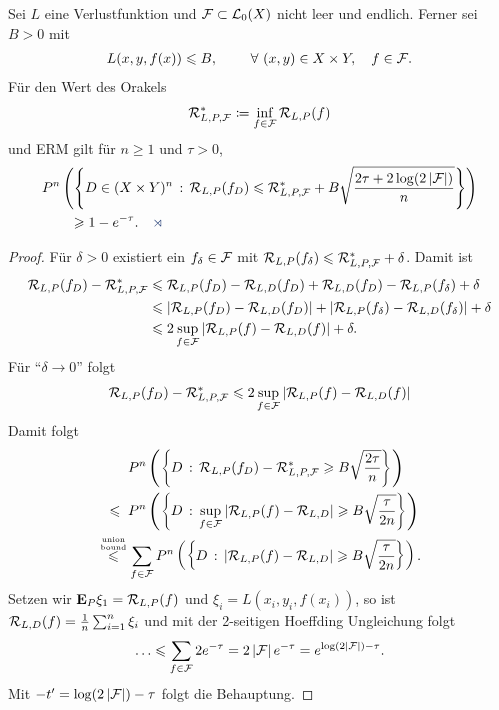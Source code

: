 \begin{prop}[Orakelungleichung I]
\label{prop:4.1.2}
Sei $L$ eine Verlustfunktion und $\mathcal{F}\subset\mathcal{L}_0(X)$ nicht leer und endlich.
Ferner sei $B>0$ mit
\begin{align*}
L(x,y,f(x)) \le B,\qquad \forall (x,y)\in X\times Y,\quad f\in\FF.
\end{align*}
Für den Wert des Orakels
\begin{align*}
\mathcal{R}_{L,P,\mathcal{F}}^* \coloneq \inf_{f\in\mathcal{F}} \mathcal{R}_{L,P}(f)
\end{align*}
und ERM gilt für $n\ge 1$ und $\tau > 0$,
\begin{align*}
&P^n\left(\setdef{D\in (X\times Y)^n}{\RR_{L,P}(f_D) \le \RR_{L,P,\FF}^* +
B\sqrt{\frac{2\tau + 2\log(2\abs{\FF})}{n}} } \right)\\ 
&\qquad\ge 1-e^{-\tau}.\fishhere
\end{align*}
\end{prop}
\begin{proof}
Für $\delta > 0$ existiert ein $f_\delta \in\mathcal{F}$ mit $\mathcal{R}_{L,P}(f_\delta)\leqslant
\mathcal{R}_{L,P,\mathcal{F}}^* + \delta$. Damit ist
\begin{align*}
\mathcal{R}_{L,P}(f_D) - \mathcal{R}_{L,P,\mathcal{F}}^*
&\leqslant \mathcal{R}_{L,P}(f_D)-\mathcal{R}_{L,D}(f_D) + \mathcal{R}_{L,D}(f_D)
- \mathcal{R}_{L,P}(f_\delta)+ \delta\\
&\leqslant \left|\mathcal{R}_{L,P}(f_D)-\mathcal{R}_{L,D}(f_D)\right| + 
\left|\mathcal{R}_{L,P}(f_\delta)-\mathcal{R}_{L,D}(f_\delta)\right| + \delta\\
&\leqslant 2 \sup_{f\in\mathcal{F}} \left|\mathcal{R}_{L,P}(f)-\mathcal{R}_{L,D}(f)\right| + \delta.
\end{align*}
Für "`$\delta\to 0$"' folgt
\begin{align*}
\mathcal{R}_{L,P}(f_D) - \mathcal{R}_{L,P,\mathcal{F}}^* \leqslant
2 \sup_{f\in\mathcal{F}} \left|\mathcal{R}_{L,P}(f)-\mathcal{R}_{L,D}(f)\right|
\end{align*}
Damit folgt
\begin{align*}
&P^n\left(\setdef{D}{\RR_{L,P}(f_D)- \RR_{L,P,\FF}^* \ge
B\sqrt{\frac{2\tau}{n}}} \right)\\
\le\;\; 
&P^n\left(\setdef{D}{\sup_{f\in\FF}\abs{\RR_{L,P}(f)- \RR_{L,D}} \ge
B\sqrt{\frac{\tau}{2n}}}\right)\\
\overset{\atop{\text{union}}{\text{bound}}}{\le}
&\sum_{f\in\FF}
P^n\left(\setdef{D}{\abs{\RR_{L,P}(f)- \RR_{L,D}} \ge
B\sqrt{\frac{\tau}{2n}}}\right).
\end{align*}
Setzen wir $\textbf{E}_P\xi_1 =\mathcal{R}_{L,P}(f)$ und $\xi_i = L(x_i,y_i,f(x_i))$, so ist
$\mathcal{R}_{L,D}(f) = \frac{1}{n}\sum_{i=1}^n \xi_i$ und mit der 2-seitigen
Hoeffding Ungleichung folgt
\begin{align*}
\ldots \leqslant 
\sum_{f\in\mathcal{F}} 2e^{-\tau} = 2\left|\mathcal{F}\right|e^{-\tau} = e^{\log(2\left|\mathcal{F}\right|)-\tau}.
\end{align*}
Mit $-t' = \log(2\left|\mathcal{F}\right|)-\tau$ folgt die Behauptung.\qedhere
\end{proof}

